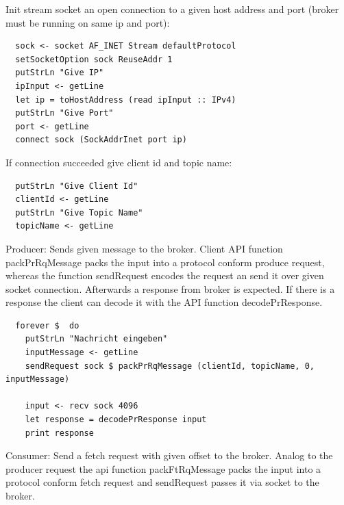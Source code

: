 Init stream socket an open connection to a given host address and port (broker must be running on same ip and port): 
\begin{lstlisting}
  sock <- socket AF_INET Stream defaultProtocol 
  setSocketOption sock ReuseAddr 1
  putStrLn "Give IP"
  ipInput <- getLine
  let ip = toHostAddress (read ipInput :: IPv4)
  putStrLn "Give Port"
  port <- getLine
  connect sock (SockAddrInet port ip)
\end{lstlisting}

If connection succeeded give client id and topic name: 
\begin{lstlisting}
  putStrLn "Give Client Id"
  clientId <- getLine
  putStrLn "Give Topic Name"
  topicName <- getLine
\end{lstlisting}

Producer: Sends given message to the broker. Client API function packPrRqMessage
packs the input into a protocol conform produce request, whereas the function
sendRequest encodes the request an send it over given socket connection.
Afterwards a response from broker is expected. If there is a response the client
can decode it with the API function decodePrResponse. 
\begin{lstlisting}
  forever $  do 
    putStrLn "Nachricht eingeben"
    inputMessage <- getLine
    sendRequest sock $ packPrRqMessage (clientId, topicName, 0, inputMessage)

    input <- recv sock 4096
    let response = decodePrResponse input
    print response 
\end{lstlisting}

Consumer: Send a fetch request with given offset to the broker. Analog to the producer request 
the api function packFtRqMessage packs the input into a protocol conform fetch request and sendRequest passes it via socket to the broker. 


